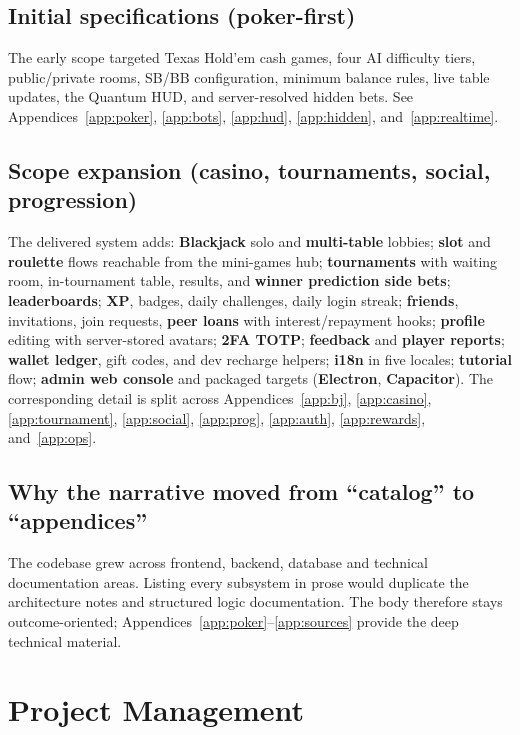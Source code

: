 \documentclass[11pt,a4paper]{article}
\begin{document}
\subsection{Initial specifications (poker-first)}

The early scope targeted Texas Hold'em cash games, four AI difficulty tiers, public/private rooms, SB/BB configuration, minimum balance rules, live table updates, the Quantum HUD, and server-resolved hidden bets. See Appendices~\ref{app:poker}, \ref{app:bots}, \ref{app:hud}, \ref{app:hidden}, and~\ref{app:realtime}.

\subsection{Scope expansion (casino, tournaments, social, progression)}

The delivered system adds: \textbf{Blackjack} solo and \textbf{multi-table} lobbies; \textbf{slot} and \textbf{roulette} flows reachable from the mini-games hub; \textbf{tournaments} with waiting room, in-tournament table, results, and \textbf{winner prediction side bets}; \textbf{leaderboards}; \textbf{XP}, badges, daily challenges, daily login streak; \textbf{friends}, invitations, join requests, \textbf{peer loans} with interest/repayment hooks; \textbf{profile} editing with server-stored avatars; \textbf{2FA TOTP}; \textbf{feedback} and \textbf{player reports}; \textbf{wallet ledger}, gift codes, and dev recharge helpers; \textbf{i18n} in five locales; \textbf{tutorial} flow; \textbf{admin web console} and packaged targets (\textbf{Electron}, \textbf{Capacitor}). The corresponding detail is split across Appendices~\ref{app:bj}, \ref{app:casino}, \ref{app:tournament}, \ref{app:social}, \ref{app:prog}, \ref{app:auth}, \ref{app:rewards}, and~\ref{app:ops}.

\subsection{Why the narrative moved from ``catalog'' to ``appendices''}

The codebase grew across frontend, backend, database and technical documentation areas. Listing every subsystem in prose would duplicate the architecture notes and structured logic documentation. The body therefore stays outcome-oriented; Appendices~\ref{app:poker}--\ref{app:sources} provide the deep technical material.

\section{Project Management}
\label{sec:management}
\end{document}
